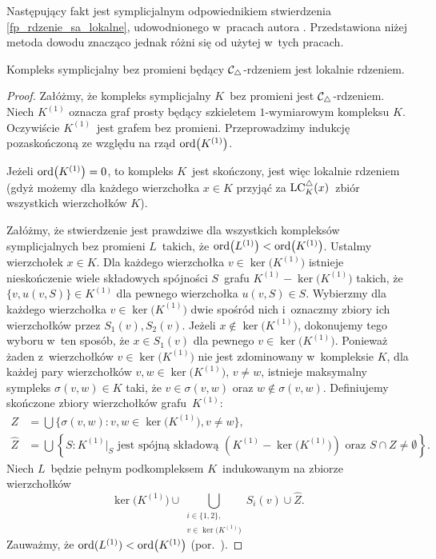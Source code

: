 Następujący fakt jest symplicjalnym odpowiednikiem stwierdzenia \ref{fp_rdzenie_sa_lokalne}, udowodnionego w~pracach autora \cite{Kukiela10a,Kukiela10}. Przedstawiona niżej metoda dowodu znacząco jednak różni się od użytej w~tych pracach.

\begin{stw}\label{stw-kompleks_bez_promieni_jest_lokalnie_rdzeniem}
Kompleks symplicjalny bez promieni będący $\mathcal{C}_\triangle$-rdzeniem jest lokalnie rdzeniem.
\end{stw}
\begin{proof}
Załóżmy, że kompleks symplicjalny $K$~bez promieni jest $\mathcal{C}_\triangle$-rdzeniem. Niech $K^{(1)}$ oznacza graf prosty będący szkieletem $1$-wymiarowym kompleksu $K$. Oczywiście $K^{(1)}$~jest grafem bez promieni. Przeprowadzimy indukcję pozaskończoną ze względu na rząd $\operatorname{ord}\bigl(K^{(1)}\bigr)$.

Jeżeli $\operatorname{ord}\bigl(K^{(1)}\bigr)=0$, to kompleks $K$~jest skończony, jest więc lokalnie rdzeniem (gdyż możemy dla każdego wierzchołka $x\in K$ przyjąć za $\operatorname{LC}^\triangle_K(x)$~zbiór wszystkich wierzchołków $K$).

Załóżmy, że stwierdzenie jest prawdziwe dla wszystkich kompleksów symplicjalnych bez promieni $L$~takich, że $\operatorname{ord}\bigl(L^{(1)}\bigr)<\operatorname{ord}\bigl(K^{(1)}\bigr)$. Ustalmy wierzchołek $x\in K$. Dla każdego wierzchołka $v\in \ker\bigl(K^{(1)}\bigr)$ istnieje nieskończenie wiele składowych spójności $S$~grafu $K^{(1)}-\ker\bigl(K^{(1)}\bigr)$ takich, że $\{v,u(v,S)\}\in K^{(1)}$ dla pewnego wierzchołka $u(v,S)\in S$. Wybierzmy dla każdego wierzchołka $v\in \ker\bigl(K^{(1)}\bigr)$ dwie spośród nich i~oznaczmy zbiory ich wierzchołków przez $S_1(v),S_2(v)$. Jeżeli $x\not\in \ker\bigl(K^{(1)}\bigr)$, dokonujemy tego wyboru w~ten sposób, że $x\in S_1(v)$ dla pewnego $v\in \ker\bigl(K^{(1)}\bigr)$. Ponieważ żaden z~wierzchołków $v\in \ker\bigl(K^{(1)}\bigr)$ nie jest zdominowany w~kompleksie $K$, dla każdej pary wierzchołków $v,w\in \ker\bigl(K^{(1)}\bigr)$, $v\not=w$, istnieje maksymalny sympleks $\sigma(v,w)\in K$ taki, że $v\in \sigma(v,w)$ oraz $w\not\in\sigma(v,w)$. Definiujemy skończone zbiory wierzchołków grafu~$K^{(1)}$: \begin{align*}Z&=\bigcup\{\sigma(v,w):v,w\in \ker\bigl(K^{(1)}\bigr), v\not=w\},\\
\hat{Z}&=\bigcup\left\{S:K^{(1)}\big|_S\text{ jest spójną składową }\left(K^{(1)}-\ker\bigl(K^{(1)}\bigr)\right)\text{ oraz } S\cap Z\not=\emptyset\right\}
.\end{align*} Niech $L$~będzie pełnym podkompleksem $K$~indukowanym na zbiorze wierzchołków \[\ker\bigl(K^{(1)}\bigr)\cup \bigcup_{\substack{i\in\{1,2\},\\v\in \ker\bigl(K^{(1)}\bigr)}} S_i(v)\cup \hat{Z}.\] Zauważmy, że $\operatorname{ord}(L^{(1)})<\operatorname{ord}\bigl(K^{(1)}\bigr)$ (por.~\cite[Corollary 3.8]{Halin98}).


\end{proof}
